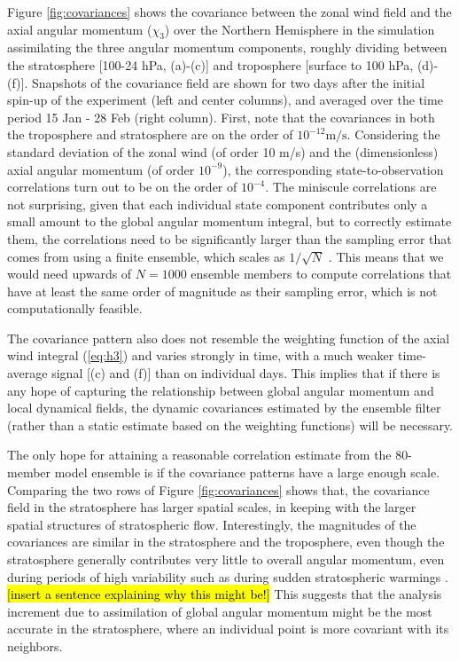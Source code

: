 Figure \ref{fig:covariances} shows the covariance between the zonal wind field and the axial angular momentum ($\chi_3$) over the Northern Hemisphere in the simulation assimilating the three angular momentum components, roughly dividing between the 
stratosphere [100-24 hPa, (a)-(c)] 
and
troposphere [surface to 100 hPa, (d)-(f)].
Snapshots of the covariance field are shown for two days after the initial spin-up of the experiment (left and center columns), and averaged over the time period 15 Jan - 28 Feb (right column).
First, note that 
the covariances in both the troposphere and stratosphere are on the order of $10^{-12}\text{m/s}$.  
Considering the standard deviation of the zonal wind (of order 10 m/s) and the (dimensionless) axial angular momentum (of order $10^{-9}$), the corresponding state-to-observation correlations turn out to be on the order of $10^{-4}$. 
The miniscule correlations are not surprising, given that each individual state component contributes only a small amount to the global angular momentum integral, but to 
correctly estimate them, the correlations need to be significantly larger than the sampling error that comes from using a finite ensemble, which 
scales as $1/\sqrt{N}$ \citep{Houtekamer1998}. 
This means that we would need upwards of $N=1000$ ensemble members to compute correlations that have at least the same order of magnitude as their sampling error, which is not computationally feasible. 

The covariance pattern also does not resemble the weighting function of the axial wind integral (\ref{eq:h3}) 
and varies strongly in time, with a much weaker time-average signal [(c) and (f)] than on individual days. 
This implies that if there is any hope of capturing the relationship between global angular momentum and local dynamical fields, the dynamic covariances estimated by the ensemble filter (rather than a static estimate based on the weighting functions) will be necessary.

The only hope for attaining a reasonable correlation estimate from the 80-member model ensemble is if the covariance patterns have a large enough scale.  
Comparing the two rows of Figure \ref{fig:covariances} shows that, 
the covariance field in the stratosphere has larger spatial scales, in keeping with the larger spatial structures of stratospheric flow.
Interestingly, the magnitudes of the covariances are similar in the stratosphere and the troposphere, even though the stratosphere generally contributes very little to overall angular momentum, even during periods of high variability such as during sudden stratospheric warmings \citep{Neef2012}.
\hl{[insert a sentence explaining why this might be!]}
This suggests that the analysis increment due to assimilation of global angular momentum might be the most accurate in the stratosphere, where an individual point is more covariant with its neighbors.  

